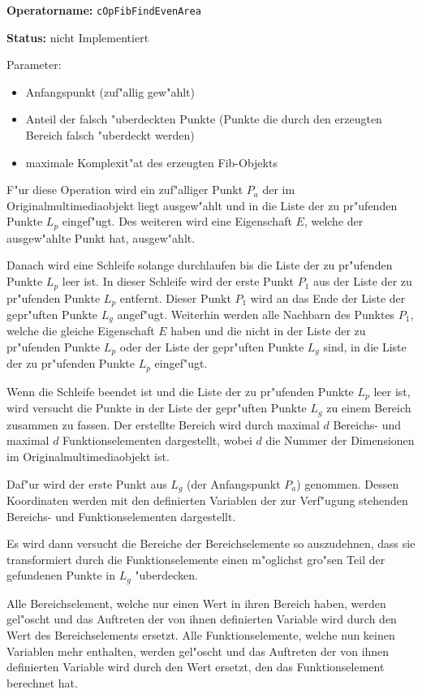 \textbf{Operatorname:} \verb|cOpFibFindEvenArea|

\bigskip\noindent
\textbf{Status:} nicht Implementiert

\bigskip\noindent
Parameter:
\begin{itemize}
 \item Anfangspunkt (zuf"allig gew"ahlt)
 \item Anteil der falsch "uberdeckten Punkte (Punkte die durch den erzeugten Bereich falsch "uberdeckt werden)
 \item maximale Komplexit"at des erzeugten Fib-Objekts
\end{itemize}

\bigskip\noindent
F"ur diese Operation wird ein zuf"alliger Punkt $P_a$ der im Originalmultimediaobjekt liegt ausgew"ahlt und in die Liste der zu pr"ufenden Punkte $L_p$ eingef"ugt. Des weiteren wird eine Eigenschaft $E$, welche der ausgew"ahlte Punkt hat, ausgew"ahlt.

Danach wird eine Schleife solange durchlaufen bis die Liste der zu pr"ufenden Punkte $L_p$ leer ist.
In dieser Schleife wird der erste Punkt $P_1$ aus der Liste der zu pr"ufenden Punkte $L_p$ entfernt. Dieser Punkt $P_1$ wird an das Ende der Liste der gepr"uften Punkte $L_g$ angef"ugt. Weiterhin werden alle Nachbarn des Punktes $P_1$, welche die gleiche Eigenschaft $E$ haben und die nicht in der Liste der zu pr"ufenden Punkte $L_p$ oder der Liste der gepr"uften Punkte $L_g$ sind, in die Liste der zu pr"ufenden Punkte $L_p$ eingef"ugt.

Wenn die Schleife beendet ist und die Liste der zu pr"ufenden Punkte $L_p$ leer ist, wird versucht die Punkte in der Liste der gepr"uften Punkte $L_g$ zu einem Bereich zusammen zu fassen. Der erstellte Bereich wird durch maximal $d$ Bereichs- und maximal $d$ Funktionselementen dargestellt, wobei $d$ die Nummer der Dimensionen im Originalmultimediaobjekt ist.

Daf"ur wird der erste Punkt aus $L_g$ (der Anfangspunkt $P_a$) genommen. Dessen Koordinaten werden mit den definierten Variablen der zur Verf"ugung stehenden Bereichs- und Funktionselementen dargestellt.

Es wird dann versucht die Bereiche der Bereichselemente so auszudehnen, dass sie transformiert durch die Funktionselemente einen m"oglichst gro"sen Teil der gefundenen Punkte in $L_g$ "uberdecken.




Alle Bereichselement, welche nur einen Wert in ihren Bereich haben, werden gel"oscht und das Auftreten der von ihnen definierten Variable wird durch den Wert des Bereichselements ersetzt. Alle Funktionselemente, welche nun keinen Variablen mehr enthalten, werden gel"oscht und das Auftreten der von ihnen definierten Variable wird durch den Wert ersetzt, den das Funktionselement berechnet hat.

